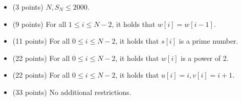 \documentclass[12pt]{scrartcl}
\begin{document}


    \begin{itemize}
        \item (3 points) $N, S_N \le 2000$.
        \item (9 points) For all $1 \le i \le N - 2$, it holds that $w[i] = w[i - 1]$.
        \item (11 points) For all $0 \le i \le N - 2$, it holds that $s[i]$ is a prime number.
        \item (22 points) For all $0 \le i \le N - 2$, it holds that $w[i]$ is a power of 2.
        \item (22 points) For all $0 \le i \le N - 2$, it holds that $u[i] = i, v[i] = i + 1$.
        \item (33 points) No additional restrictions.
    \end{itemize}
\end{document}

